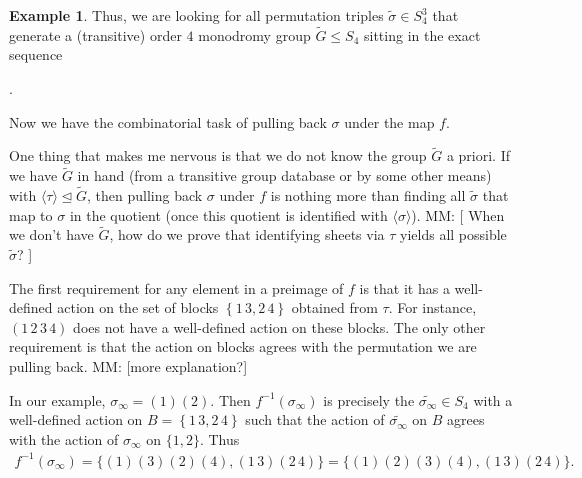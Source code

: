 \documentclass[oneside, reqno, 12pt]{amsart}
\theoremstyle{definition}
\newtheorem{example} [thm] {Example}
\theoremstyle{remark}
\newcommand{\wt}{\widetilde}
\newcommand{\mm}[1]{{\color{blue} \sf MM: [#1]}}
\begin{document}
{{\begin{example}
      Thus, we are looking for all permutation triples
      $\wt{\sigma}\in S_4^3$ that generate a (transitive) order $4$ monodromy group
      $\wt{G}\leq S_4$ sitting in the exact sequence
      \begin{center}
        .
      \end{center}
      \par
      Now we have the combinatorial task of pulling back
      $\sigma$
      under the map $f$.
      \begin{notes}
        One thing that makes me nervous is
        that we do not know the group $\wt{G}$ a priori.
        If we have $\wt{G}$ in hand
        (from a transitive group database or by some other means)
        with $\langle\tau\rangle\trianglelefteq\wt{G}$,
        then pulling back $\sigma$ under $f$
        is nothing more than finding all $\wt{\sigma}$
        that map to $\sigma$ in the quotient
        (once this quotient is identified with
        $\langle\sigma\rangle$).
        \mm{
          When we don't have $\wt{G}$,
          how do we prove that
          identifying sheets via $\tau$
          yields all possible $\wt{\sigma}$?
        }
      \end{notes}
      The first requirement for any element in a preimage of $f$
      is that it has a well-defined action on the set of blocks
      $\left\{\boxed{1\,3},\boxed{2\,4}\right\}$
      obtained from $\tau$.
      For instance,
      $(1\,2\,3\,4)$
      does not have a well-defined
      action on these blocks.
      The only other requirement
      is that the action on blocks agrees
      with the permutation we are pulling back.
      \mm{more explanation?}
      \par
      In our example, $\sigma_\infty = (1)(2)$.
      Then $f^{-1}(\sigma_\infty)$
      is precisely the $\wt{\sigma_\infty}\in S_4$
      with a well-defined action on
      $B = \left\{\boxed{1\,3},\boxed{2\,4}\right\}$
      such that the action of $\wt{\sigma_\infty}$
      on $B$ agrees with the action
      of $\sigma_\infty$ on $\{1,2\}$.
      Thus
      \begin{align*}
        f^{-1}(\sigma_\infty) = \{(1)(3)(2)(4),(1\,3)(2\,4)\}
        = \{(1)(2)(3)(4),(1\,3)(2\,4)\}.

\end{align*}
\end{example}}}
\end{document}
